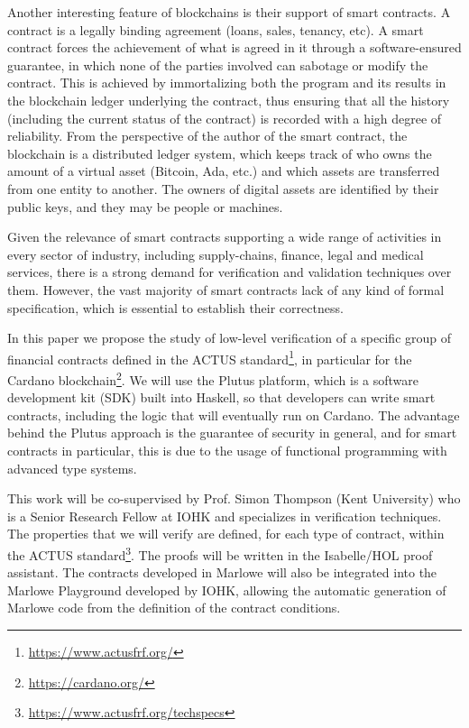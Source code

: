 \documentclass[12pt]{book}
\begin{document}
Another interesting feature of blockchains is their support of smart contracts.
A contract is a legally binding agreement (loans, sales, tenancy, etc). A smart contract forces the achievement of what is agreed in it through a software-ensured guarantee, in which none of the parties involved can sabotage or modify the contract.
This is achieved by immortalizing both the program and its results in the blockchain ledger underlying the contract, thus ensuring that all the history (including the current status of the contract) is recorded with a high degree of reliability. From the perspective of the author of the smart contract, the blockchain is a distributed ledger system, which keeps track of who owns the amount of a virtual asset (Bitcoin, Ada, etc.) and which assets are transferred from one entity to another. The owners of digital assets are identified by their public keys, and they may be people or machines.

Given the relevance of smart contracts supporting a wide range of activities in every sector of industry, including supply-chains, finance, legal and medical services, there is a strong demand for verification and validation techniques over them. However, the vast majority of smart contracts lack of any kind of formal specification, which is essential to establish their correctness.

\textcolor{darkbrown}{In this paper we propose the study of low-level verification of a specific group of financial contracts defined in the ACTUS standard\footnote{\href{https://www.actusfrf.org/}{https://www.actusfrf.org/}}, in particular for the Cardano blockchain}\footnote{\href{https://cardano.org/}{https://cardano.org/}}.
We will use the Plutus platform, which is a software development kit (SDK) built into Haskell, so that developers can write smart contracts, including the logic that will eventually run on Cardano. The advantage behind the Plutus approach is the guarantee of security in general, and for smart contracts in particular, this is due to the usage of functional programming with advanced type systems.

\textcolor{darkbrown}{This work will be co-supervised by Prof. Simon Thompson (Kent University) who is a Senior Research Fellow at IOHK and specializes in verification techniques. The properties that we will verify are defined, for each type of contract, within the ACTUS standard\footnote {\href{https://www.actusfrf.org/techspecs}{https://www.actusfrf.org/techspecs}}. The proofs will be written in the Isabelle/HOL proof assistant. The contracts developed in Marlowe will also be integrated into the Marlowe Playground developed by IOHK, allowing the automatic generation of Marlowe code from the definition of the contract conditions.}
\end{document}
